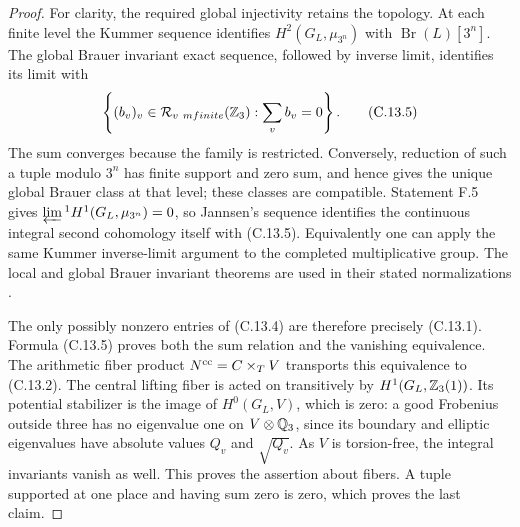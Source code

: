 \begin{proof}
For clarity, the required global injectivity retains
the topology. At each finite level the Kummer sequence
identifies $H^2(G_L,\mu_{3^n})$ with $\operatorname{Br}(L)[3^n]$.
The global Brauer invariant exact sequence, followed
by inverse limit, identifies its limit with
\[
 \left\{(b_v)_v\in\mathcal R_{v\ {
m finite}}(\mathbb Z_3):
                       \sum_v b_v=0\right\}.
 \tag{C.13.5}
\]
The sum converges because the family is restricted.
Conversely, reduction of such a tuple modulo $3^n$
has finite support and zero sum, and hence gives the
unique global Brauer class at that level; these
classes are compatible. Statement F.5 gives
$\varprojlim{}^1 H^1(G_L,\mu_{3^n})=0$, so Jannsen's
sequence identifies the continuous integral second
cohomology itself with (C.13.5). Equivalently one can
apply the same Kummer inverse-limit argument to the
completed multiplicative group. The local and global
Brauer invariant theorems are used in their stated
normalizations \cite{MilneCFT}.

The only possibly nonzero entries of (C.13.4) are
therefore precisely (C.13.1). Formula (C.13.5) proves
both the sum relation and the vanishing equivalence.
The arithmetic fiber product
$N^{\rm cc}=C\times_TV$ transports this equivalence
to (C.13.2). The central lifting fiber is acted on
transitively by $H^1(G_L,\mathbb Z_3(1))$. Its potential
stabilizer is the image of $H^0(G_L,V)$, which is
zero: a good Frobenius outside three has no eigenvalue
one on $V\otimes\mathbb Q_3$, since its boundary and elliptic
eigenvalues have absolute values $Q_v$ and
$\sqrt{Q_v}$. As $V$ is torsion-free, the integral
invariants vanish as well. This proves the assertion
about fibers. A tuple supported at one place and
having sum zero is zero, which proves the last claim.
\end{proof}

